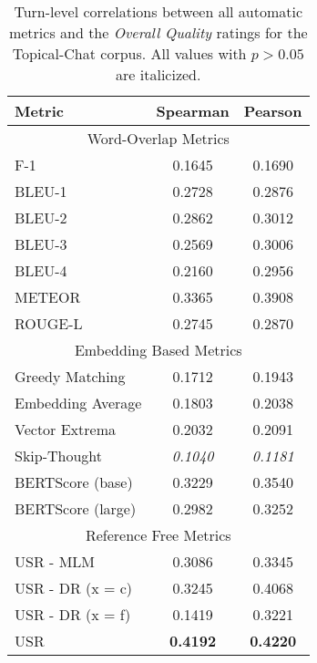 \documentclass[11pt,a4paper]{article}
\begin{document}
\begin{table}
\centering
\begin{tabular}{|l|c|c|}
\hline
Metric                    & Spearman & Pearson  \\\hline
\multicolumn{3}{|c|}{Word-Overlap Metrics} \\ \hline
F-1                       & 0.1645   & 0.1690   \\
BLEU-1                    & 0.2728   & 0.2876   \\
BLEU-2                    & 0.2862   & 0.3012   \\
BLEU-3                    & 0.2569   & 0.3006   \\
BLEU-4                    & 0.2160   & 0.2956   \\
METEOR                    & 0.3365   & 0.3908   \\
ROUGE-L                   & 0.2745   & 0.2870   \\\hline
\multicolumn{3}{|c|}{Embedding Based Metrics} \\ \hline
Greedy Matching           & 0.1712   & 0.1943   \\
Embedding Average         & 0.1803   & 0.2038   \\
Vector Extrema            & 0.2032   & 0.2091   \\
Skip-Thought              & \textit{0.1040} & \textit{0.1181} \\
BERTScore (base)  & 0.3229   & 0.3540   \\
BERTScore (large) & 0.2982   & 0.3252   \\ \hline
\multicolumn{3}{|c|}{Reference Free Metrics} \\ \hline
USR - MLM               & 0.3086   & 0.3345   \\
USR - DR (x = c)   & 0.3245   & 0.4068   \\
USR - DR (x = f)   & 0.1419   & 0.3221   \\
USR             & \textbf{0.4192 }  & \textbf{0.4220 } \\\hline
\end{tabular}
\caption{Turn-level correlations between all automatic metrics and the \textit{Overall Quality} ratings for the Topical-Chat corpus. All values with $p > 0.05$ are italicized.}
\label{tab:turn_overall}
\end{table}
\end{document}
